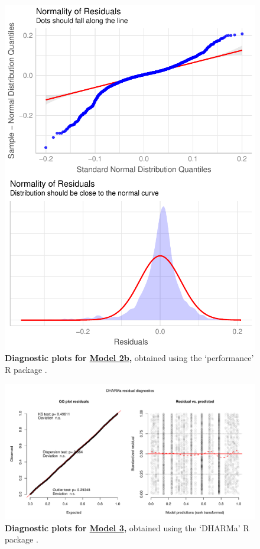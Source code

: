 \begin{figure}[h!]
\centering
\includegraphics[scale=0.7]{Supporting/Chapter3/Figures/Diagnostics/SI_diagnostics_Model2b}
\caption[Diagnostic plots for Model 2b]{\textbf{Diagnostic plots for \underline{Model 2b},} obtained using the `performance' R package \citep{performance}.}
\label{}
\end{figure}

\newpage

\begin{figure}[h!]
\centering
\includegraphics[scale=0.6]{Supporting/Chapter3/Figures/Diagnostics/SI_diagnostics_Model3}
\caption[Diagnostic plots for Model 3]{\textbf{Diagnostic plots for \underline{Model 3},} obtained using the `DHARMa' R package \citep{DHARMa}.}
\label{}
\end{figure}

